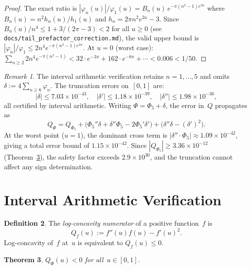 \documentclass[11pt]{article}
\newtheorem{theorem}{Theorem}
\theoremstyle{definition}
\newtheorem{definition}[theorem]{Definition}
\theoremstyle{remark}
\newtheorem{remark}[theorem]{Remark}
\begin{document}
\begin{proof}
The exact ratio is $|\varphi_n(u)|/\varphi_1(u) = B_n(u)\,e^{-\pi(n^2-1)e^{2u}}$ where $B_n(u) = n^2 h_n(u)/h_1(u)$ and $h_n = 2\pi n^2 e^{2u}-3$. Since $B_n(u)/n^4 \leq 1 + 3/(2\pi-3) < 2$ for all $u \geq 0$ (see \texttt{docs/tail\_prefactor\_correction.md}), the valid upper bound is $|\varphi_n|/\varphi_1 \leq 2n^4 e^{-\pi(n^2-1)e^{2u}}$. At $u = 0$ (worst case): $\sum_{n\geq 2} 2n^4 e^{-\pi(n^2-1)} < 32\cdot e^{-3\pi} + 162\cdot e^{-8\pi} + \cdots < 0.006 < 1/50$.
\end{proof}

\begin{remark}\label{rem:truncation}
The interval arithmetic verification retains $n = 1,\ldots,5$ and omits $\delta := 4\sum_{n \geq 6}\varphi_n$. The truncation errors on~$[0,1]$ are:
\[
|\delta| \leq 7.03 \times 10^{-43}, \quad
|\delta'| \leq 1.18 \times 10^{-39}, \quad
|\delta''| \leq 1.98 \times 10^{-36},
\]
all certified by interval arithmetic. Writing $\Phi = \Phi_5 + \delta$, the error in~$Q$ propagates as
\[
Q_\Phi = Q_{\Phi_5} + \bigl(\Phi_5''\delta + \delta''\Phi_5 - 2\Phi_5'\delta'\bigr) + \bigl(\delta''\delta - (\delta')^2\bigr).
\]
At the worst point ($u = 1$), the dominant cross term is $|\delta''\cdot\Phi_5| \approx 1.09 \times 10^{-42}$, giving a total error bound of $1.15 \times 10^{-42}$. Since $|Q_{\Phi_5}| \geq 3.36 \times 10^{-12}$ (Theorem~\ref{thm:ia}), the safety factor exceeds $2.9 \times 10^{30}$, and the truncation cannot affect any sign determination.
\end{remark}

\section{Interval Arithmetic Verification}
\label{sec:ia}

\begin{definition}
The \emph{log-concavity numerator} of a positive function~$f$ is
\[
Q_f(u) := f''(u)f(u) - f'(u)^2.
\]
Log-concavity of~$f$ at~$u$ is equivalent to $Q_f(u) \leq 0$.
\end{definition}

\begin{theorem}\label{thm:ia}
$Q_\Phi(u) < 0$ for all~$u \in [0, 1]$.
\end{theorem}
\end{document}
